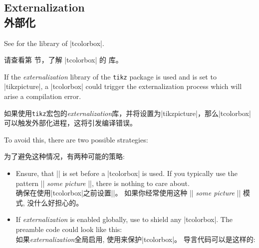 \subsection{Externalization\\外部化}

\begin{marker}
See  for the  library of |tcolorbox|.

请查看第  节，了解 |tcolorbox| 的  库。
\end{marker}

If the \emph{externalization} library of the \texttt{tikz} package is used
and  is set to |tikzpicture|,
a |tcolorbox| could trigger the externalization process which will arise
a compilation error.

如果使用\texttt{tikz}宏包的\emph{externalization}库，并将设置为|tikzpicture|，那么|tcolorbox|可以触发外部化进程，这将引发编译错误。



To avoid this, there are two possible strategies:

为了避免这种情况，有两种可能的策略:
\begin{itemize}
\item 
Ensure, that |\tikzexternaldisable| is set before a |tcolorbox| is used.
If you typically use the pattern |\tikzexternalenable| \textit{some picture} |\tikzexternaldisable|,
there is nothing to care about.
\\确保在使用|tcolorbox|之前设置|\tikzexternaldisable|。%
如果你经常使用这种 |\tikzexternalenable| \textit{some picture} |\tikzexternaldisable| 模式,
没什么好担心的。
\item 
If \emph{externalization} is enabled globally, use  to
shield any |tcolorbox|. The preamble code could look like this:
\\如果\emph{externalization}全局启用, 使用来保护|tcolorbox|。%
导言代码可以是这样的:
\begin{dispListing}
\usetikzlibrary{external}
\tikzexternalize
{}
\end{dispListing}
\end{itemize}

